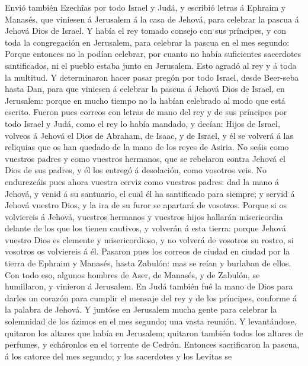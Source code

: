  Envió también Ezechîas por todo Israel y Judá, y escribió
letras á Ephraim y Manasés, que viniesen á Jerusalem á la casa de
Jehová, para celebrar la pascua á Jehová Dios de Israel.  Y
había el rey tomado consejo con sus príncipes, y con toda la
congregación en Jerusalem, para celebrar la pascua en el mes segundo:
 Porque entonces no la podían celebrar, por cuanto no había
suficientes sacerdotes santificados, ni el pueblo estaba junto en
Jerusalem.  Esto agradó al rey y á toda la multitud.
 Y determinaron hacer pasar pregón por todo Israel, desde
Beer-seba hasta Dan, para que viniesen á celebrar la pascua á Jehová
Dios de Israel, en Jerusalem: porque en mucho tiempo no la habían
celebrado al modo que está escrito.  Fueron pues correos con
letras de mano del rey y de sus príncipes por todo Israel y Judá, como
el rey lo había mandado, y decían: Hijos de Israel, volveos á Jehová el
Dios de Abraham, de Isaac, y de Israel, y él se volverá á las reliquias
que os han quedado de la mano de los reyes de Asiria.  No
seáis como vuestros padres y como vuestros hermanos, que se rebelaron
contra Jehová el Dios de sus padres, y él los entregó á desolación, como
vosotros veis.  No endurezcáis pues ahora vuestra cerviz
como vuestros padres: dad la mano á Jehová, y venid á su santuario, el
cual él ha santificado para siempre; y servid á Jehová vuestro Dios, y
la ira de su furor se apartará de vosotros.  Porque si os
volviereis á Jehová, vuestros hermanos y vuestros hijos hallarán
misericordia delante de los que los tienen cautivos, y volverán á esta
tierra: porque Jehová vuestro Dios es clemente y misericordioso, y no
volverá de vosotros su rostro, si vosotros os volviereis á él.
 Pasaron pues los correos de ciudad en ciudad por la tierra
de Ephraim y Manasés, hasta Zabulón: mas se reían y burlaban de ellos.
 Con todo eso, algunos hombres de Aser, de Manasés, y de
Zabulón, se humillaron, y vinieron á Jerusalem.  En Judá
también fué la mano de Dios para darles un corazón para cumplir el
mensaje del rey y de los príncipes, conforme á la palabra de Jehová.
 Y juntóse en Jerusalem mucha gente para celebrar la
solemnidad de los ázimos en el mes segundo; una vasta reunión.
 Y levantándose, quitaron los altares que había en
Jerusalem; quitaron también todos los altares de perfumes, y echáronlos
en el torrente de Cedrón.  Entonces sacrificaron la pascua,
á los catorce del mes segundo; y los sacerdotes y los Levitas se

